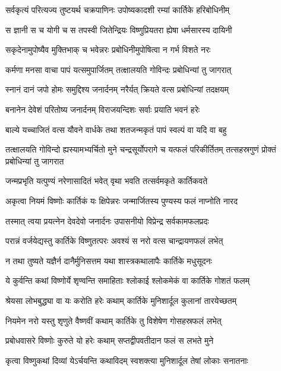 \twolineshloka
{सर्वकृत्यं परित्यज्य तुष्टयर्थ चक्रपाणिनः}
{उपोष्यकादशी रम्यां कार्तिके हरिबोधिनीम्} %

\twolineshloka
{स ज्ञानी स च योगी च स तपस्वी जितेन्द्रियः}
{विष्णुप्रियतरा ह्येषा धर्मसारस्य दायिनी} %

\twolineshloka
{सकृदेनामुपोष्यैव मुक्तिभाक् च भवेन्नरः}
{प्रबोधिनीमुपोषित्वा न गर्भ विशते नरः} %

\twolineshloka
{कर्मणा मनसा वाचा पापं यत्समुपार्जितम्}
{तत्क्षालयति गोविन्दः प्रबोधिन्यां तु जागरात्} %

\twolineshloka
{स्नानं दानं जपो होमः समुद्दिश्य जनार्दनम्}
{नरैर्यत् क्रियते वत्स प्रबोधिन्यां तदक्षयम्} %

\twolineshloka
{बनानेन देवेशं परितोष्य जनार्दनम्}
{विराजयन्दिशः सर्वाः प्रयाति भवनं हरेः} %

\twolineshloka
{बाल्ये यच्चाजितं वत्स यौवने वार्धके तथा}
{शतजन्मकृतं पापं स्वल्पं वा यदि वा बहु} %


\threelineshloka
{तत्क्षालयति गोविन्दो ह्यस्यामभ्यर्चितो मुने}
{चन्द्रसूर्योपरागे च यत्फलं परिकीर्तितम्}
{तत्सहस्रगुणं प्रोक्तं प्रबोधिन्यां तु जागरात} %

\twolineshloka
{जन्मप्रभृति यत्पुण्यं नरेणासादितं भवेत्}
{वृथा भवति तत्सर्वमकृते कार्तिकवते} %

\twolineshloka
{अकृत्वा नियमं विष्णोः कार्तिकं यः क्षिपेन्नरः}
{जन्मार्जितस्य पुण्यस्य फलं नाप्नोति नारद} %

\twolineshloka
{तस्मात् त्वया प्रयत्नेन देवदेवो जनार्दनः}
{उपासनीयो विप्रेन्द्र सर्वकामफलप्रदः} %

\twolineshloka
{परान्नं वर्जयेद्यस्तु कार्तिके विष्णुतत्परः}
{अवश्यं स नरो वत्स चान्द्रायणफलं लभेत्} %

\twolineshloka
{न तथा तुष्यते यज्ञैर्न दानैर्मुनिसत्तम}
{यथा शास्त्रकथालापैः कार्तिके मधुसूदनः} %

\twolineshloka
{ये कुर्वन्ति कथां विष्णोर्ये शृण्वन्ति समाहिताः}
{श्लोकाई श्लोकमेकं वा कार्तिके गोशतं फलम्} %

\twolineshloka
{श्रेयसा लोभबुद्ध्या वा यः करोति हरेः कथाम्}
{कार्तिके मुनिशार्दूल कुलानां तारयेच्छतम्} %

\twolineshloka
{नियमेन नरो यस्तु शृणुते वैष्णवीं कथाम्}
{कार्तिके तु विशेषेण गोसहस्रफलं लभेत्} %

\twolineshloka
{प्रबोधवासरे विष्णोः कुरुते यो हरेः कथाम्}
{सप्तद्वीपवतीदान फलं स लभते मुने} %

\twolineshloka
{कृत्वा विष्णुकथां दिव्यां येऽर्चयन्ति कथाविदम्}
{स्वशक्त्या मुनिशार्दूल तेषां लोकाः सनातनाः} %

